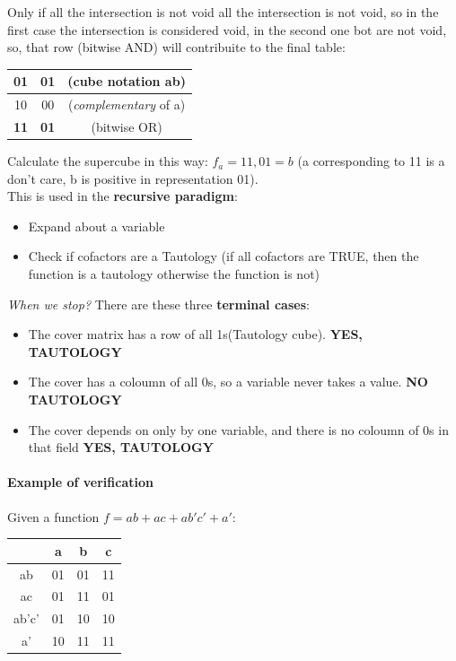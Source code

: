 	Only if all the intersection is not void all the intersection is not void, so in the first case the intersection is considered void, in the second one bot are not void, so, that row (bitwise AND) will contribuite to the final table:\\ 
	
\begin{center}
		\begin{tabular}{c | c | c}
		01 & 01 & (cube notation ab) \\ \hline
		10 & 00 & (\textit{complementary} of a)\\ \hline 
		\textbf{11} & \textbf{01} & (bitwise OR) \\
	\end{tabular}
\end{center}
	
Calculate the supercube in this way: $f_{a} = 11,01 = b$ (a corresponding to 11 is a don't care, b is positive in representation 01).\\

This is used in the \textbf{recursive paradigm}:

\begin{itemize}
	\item Expand about a variable
	\item Check if cofactors are a Tautology (if all cofactors are TRUE, then the function is a tautology otherwise the function is not)
\end{itemize}

\textit{When we stop?} There are these three \textbf{terminal cases}:
\\
\begin{itemize}
	\item The cover matrix has a row of all 1s(Tautology cube). \textbf{YES, TAUTOLOGY}
	\item The cover has a coloumn of all 0s, so a variable never takes a value. \textbf{NO TAUTOLOGY}
	\item The cover depends on only by one variable, and there is no coloumn of 0s in that field \textbf{YES, TAUTOLOGY}
\end{itemize}

\paragraph{Example of verification} Given a function $f= ab+ac+ab'c'+a'$:

\begin{center}
	\begin{tabular}{c || c | c | c}
	{} & a & b & c \\ \hline \hline
	ab & 01 & 01 & 11\\ \hline
	ac & 01 & 11 & 01\\ \hline 
	ab'c' & 01 & 10 & 10 \\ \hline
	a' & 10 & 11 & 11
\end{tabular}
\end{center}


